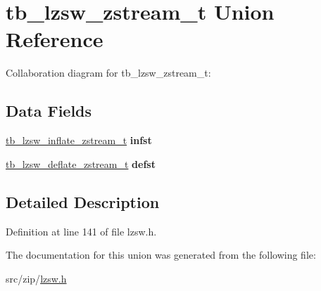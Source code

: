 \hypertarget{uniontb__lzsw__zstream__t}{\section{tb\-\_\-lzsw\-\_\-zstream\-\_\-t Union Reference}
\label{d1/d7c/uniontb__lzsw__zstream__t}
}


Collaboration diagram for tb\-\_\-lzsw\-\_\-zstream\-\_\-t\-:
\subsection*{Data Fields}
\begin{DoxyCompactItemize}
\item 
\hypertarget{uniontb__lzsw__zstream__t_a137a70c880a3297de99427a2a13a116d}{\hyperlink{structtb__lzsw__inflate__zstream__t}{tb\-\_\-lzsw\-\_\-inflate\-\_\-zstream\-\_\-t} {\bfseries infst}}\label{d1/d7c/uniontb__lzsw__zstream__t_a137a70c880a3297de99427a2a13a116d}

\item 
\hypertarget{uniontb__lzsw__zstream__t_aea397939847c223ae4176757927b24a3}{\hyperlink{structtb__lzsw__deflate__zstream__t}{tb\-\_\-lzsw\-\_\-deflate\-\_\-zstream\-\_\-t} {\bfseries defst}}\label{d1/d7c/uniontb__lzsw__zstream__t_aea397939847c223ae4176757927b24a3}

\end{DoxyCompactItemize}


\subsection{Detailed Description}


Definition at line 141 of file lzsw.\-h.



The documentation for this union was generated from the following file\-:\begin{DoxyCompactItemize}
\item 
src/zip/\hyperlink{lzsw_8h}{lzsw.\-h}\end{DoxyCompactItemize}
